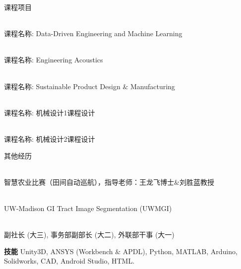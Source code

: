 \documentclass{resume} %
\begin{document}
\begin{rSection}{\fangsong 课程项目}
	
	\begin{rSubsection}{}{}
		{}{}
		\item {\\ 课程名称: Data-Driven Engineering and Machine Learning}\\
		
		\item {\\ 课程名称: Engineering Acoustics}\\
		
		\item {\\ 课程名称: Sustainable Product Design $\&$ Manufacturing}\\
		
		\item { \\ 课程名称: 机械设计1课程设计}\\
		
		\item {\\ 课程名称: 机械设计2课程设计}\\
	\end{rSubsection}
	
	
\end{rSection}


\begin{rSection}{\fangsong 其他经历}
	
	\begin{rSubsection}{}{}
		{}{}
		\item {\\ 智慧农业比赛（田间自动巡航），指导老师：王龙飞博士\&刘胜蓝教授}\\
		
		\item {\\UW-Madison GI Tract Image Segmentation (UWMGI)}\\
		
		\item {\\副社长 (大三), 事务部副部长 (大二), 外联部干事 (大一)}\\
	\end{rSubsection}
	
\end{rSection}
\newpage
\begin{rSection}{\bf{\fangsong 技能}}
	Unity3D, ANSYS (Workbench $\&$ APDL), Python, MATLAB, Arduino, Solidworks, CAD, Android Studio, HTML.  \\
\end{rSection}
\end{document}
